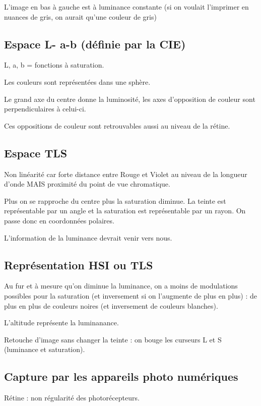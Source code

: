 \documentclass{report}
\begin{document}
L'image en bas à gauche est à luminance constante (si on voulait l'imprimer en nuances de gris, on aurait qu'une couleur de gris)

\subsection*{Espace L- a-b (définie par la CIE)}

L, a, b = fonctions à saturation.

Les couleurs sont représentées dans une sphère.

Le grand axe du centre donne la luminosité, les axes d'opposition de couleur sont perpendiculaires à celui-ci.

Ces oppositions de couleur sont retrouvables aussi au niveau de la rétine.

\subsection*{Espace TLS}

Non linéarité car forte distance entre Rouge et Violet au niveau de la longueur d'onde MAIS proximité du point de vue chromatique.

Plus on se rapproche du centre plus la saturation diminue. La teinte est représentable par un angle et la saturation est représentable par un rayon. On passe donc en coordonnées polaires.

L'information de la luminance devrait venir vers nous.

\subsection*{Représentation HSI ou TLS}

Au fur et à mesure qu'on diminue la luminance, on a moins de modulations possibles pour la saturation (et inversement si on l'augmente de plus en plus) : de plus en plus de couleurs noires (et inversement de couleurs blanches).

L'altitude représente la luminanance.

Retouche d'image sans changer la teinte : on bouge les curseurs L et S (luminance et saturation).

\subsection*{Capture par les appareils photo numériques}

Rétine : non régularité des photorécepteurs.
\end{document}
